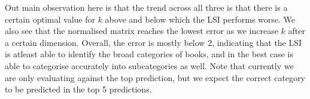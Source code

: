 \documentclass[article]{article}
\begin{document}
Out main observation here is that the trend across all three is that there is a certain optimal value for $k$ above and below which the LSI performs worse. We also see that the normalised matrix reaches the lowest error as we increase $k$ after a certain dimension. Overall, the error is mostly below 2, indicating that the LSI is atleast able to identify the broad categories of books, and in the best case is able to categorise accurately into subcategories as well. Note that currently we are only evaluating against the top prediction, but we expect the correct category to be predicted in the top 5 predictions.
\end{document}
